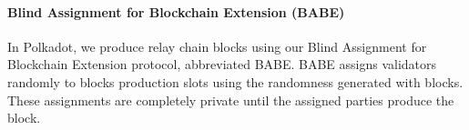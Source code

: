 \paragraph{Blind Assignment for Blockchain Extension (BABE)}

In Polkadot, we produce relay chain blocks using our Blind Assignment for Blockchain Extension protocol, abbreviated BABE. BABE assigns validators randomly to blocks production slots using  the randomness generated with blocks. These assignments are completely private until the assigned parties produce the block.